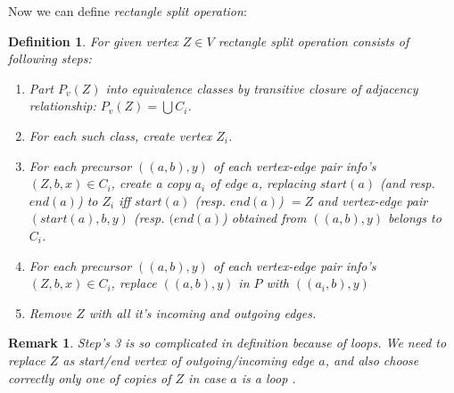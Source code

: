 \documentclass[12pt,a4paper,oneside]{article}
\newtheorem{definition}{Definition}
\newtheorem{remark}{Remark}
\begin{document}
Now we can define \emph{rectangle split operation}:
\begin{definition}
For given vertex $Z \in V$ rectangle split operation consists of following steps:
\begin{enumerate}
\item Part $P_v(Z)$ into equivalence classes by transitive closure of adjacency relationship: $P_v(Z) = \bigcup C_i$. 
\item For each such class, create vertex $Z_i$.
\item For each precursor $((a, b), y)$ of each vertex-edge pair info's $(Z, b, x) \in C_i$,  create a copy $a_i$ of edge $a$, replacing $start(a)$ (and resp. $end(a)$) to $Z_i$ iff $start(a)$ (resp. $end(a)$) $=Z$ and vertex-edge pair $(start(a), b, y)$ (resp. $(end(a)$) obtained from $((a, b), y)$ belongs to $C_i$.
\item For each precursor $((a, b), y)$ of each vertex-edge pair info's $(Z, b, x) \in C_i$, replace $((a, b), y)$ in $P$ with $((a_i, b), y)$
\item Remove $Z$ with all it's incoming and outgoing edges.
\end{enumerate} 
\end{definition} 
\begin{remark}
   Step's 3 is so complicated in definition because of loops. We need to replace $Z$ as start/end vertex of outgoing/incoming edge $a$, and also choose correctly only one of copies of $Z$ in case $a$ is a loop . 
\end{remark}
\end{document}
